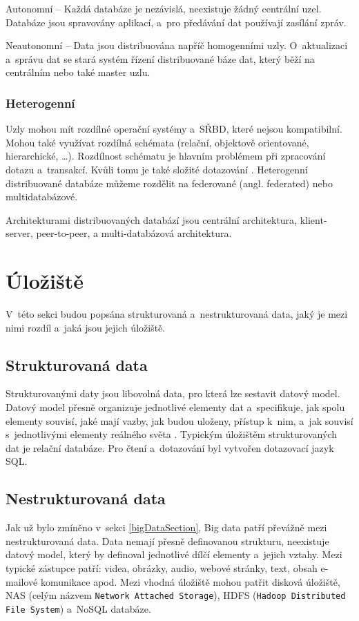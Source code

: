 \vspace{0.5cm}
\noindent Autonomní -- Každá databáze je nezávislá, neexistuje žádný centrální uzel. Databáze jsou spravovány aplikací, a~pro předávání dat používají zasílání zpráv.

\vspace{0.5cm}
\noindent Neautonomní -- Data jsou distribuována napříč homogenními uzly. O~aktualizaci a~správu dat se stará systém řízení distribuované báze dat, který běží na centrálním nebo také master uzlu.

\subsubsection{Heterogenní}
Uzly mohou mít rozdílné operační systémy a~SŘBD, které nejsou kompatibilní. Mohou také využívat rozdílná schémata (relační, objektově orientované, hierarchické, \ldots). Rozdílnost schématu je hlavním problémem při zpracování dotazu a~transakcí. Kvůli tomu je také složité dotazování \cite{wikiDBMS}. Heterogenní distribuované databáze můžeme rozdělit na federované (angl. federated) nebo multidatabázové.

\vspace{0.5cm}
\noindent Architekturami distribuovaných databází jsou centrální architektura, klient-server, peer-to-peer, a multi-databázová architektura.

\section{Úložiště} \label{storage}
V~této sekci budou popsána strukturovaná a~nestrukturovaná data, jaký je mezi nimi rozdíl a~jaká jsou jejich úložiště.

\subsection{Strukturovaná data}
Strukturovanými daty jsou libovolná data, pro která lze sestavit datový model. Datový model přesně organizuje jednotlivé elementy dat a~specifikuje, jak spolu elementy souvisí, jaké mají vazby, jak budou uloženy, přístup k~nim, a~jak souvisí s~jednotlivými elementy reálného světa \cite{structData}. Typickým úložištěm strukturovaných dat je relační databáze. Pro čtení a~dotazování byl vytvořen dotazovací jazyk SQL.

\subsection{Nestrukturovaná data}
Jak už bylo zmíněno v~sekci \ref{bigDataSection}, Big data patří převážně mezi nestrukturovaná data. Data nemají přesně definovanou strukturu, neexistuje datový model, který by definoval jednotlivé dílčí elementy a~jejich vztahy. Mezi typické zástupce patří: videa, obrázky, audio, webové stránky, text, obsah e-mailové komunikace apod. Mezi vhodná úložiště mohou patřit disková úložiště, NAS (celým názvem \texttt{Network Attached Storage}), HDFS (\texttt{Hadoop Distributed File System}) a~NoSQL databáze.


